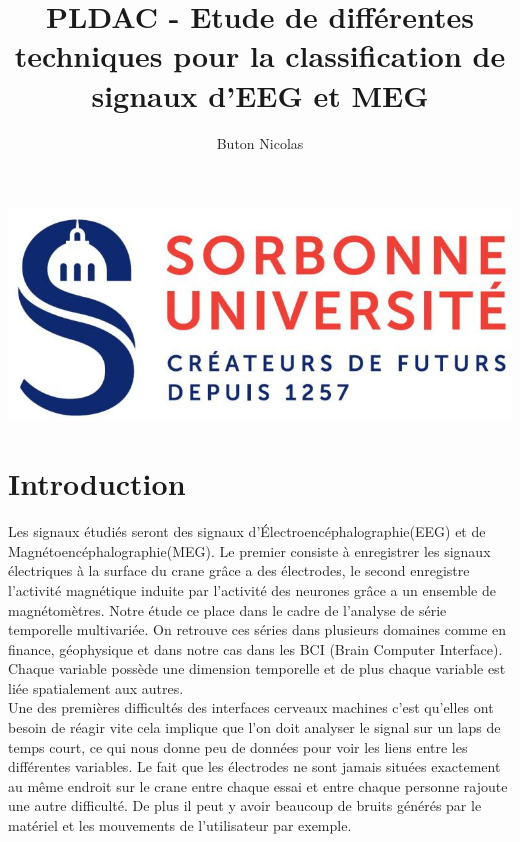 \documentclass{article}[12pt]
\title{PLDAC - Etude de différentes techniques pour la classification de signaux d'EEG et MEG}
\author{Buton Nicolas}
\begin{document}
\maketitle
\begin{center}
\includegraphics[scale=1]{images/logoSorbonne.jpg}
\end{center}
\newpage
\tableofcontents
\newpage
{}
\part{Introduction}
Les signaux étudiés seront des signaux d'Électroencéphalographie(EEG) et de Magnétoencéphalographie(MEG). Le premier consiste à enregistrer les signaux électriques à la surface du crane grâce a des électrodes, le second enregistre l'activité magnétique induite par l'activité des neurones grâce a un ensemble de magnétomètres. Notre étude ce place dans le cadre de l'analyse de série temporelle multivariée. On retrouve ces séries dans plusieurs domaines comme en finance, géophysique et dans notre cas dans les BCI (Brain Computer Interface). Chaque variable possède une dimension temporelle et de plus chaque variable est liée spatialement aux autres.\\

Une des premières difficultés des interfaces cerveaux machines c'est qu'elles ont besoin de réagir vite cela implique que l'on doit analyser le signal sur un laps de temps court, ce qui nous donne peu de données pour voir les liens entre les différentes variables. Le fait que les électrodes ne sont jamais situées exactement au même endroit sur le crane entre chaque essai et entre chaque personne rajoute une autre difficulté. De plus il peut y avoir beaucoup de bruits générés par le matériel et les mouvements de l'utilisateur par exemple.\\
\end{document}
